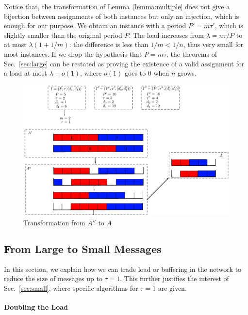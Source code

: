 \documentclass[a4paper,UKenglish,cleveref, autoref, thm-restate]{lipics-v2019}
\begin{document}
Notice that, the transformation of Lemma~\ref{lemma:multiple} does not give a bijection between assignments of both instances but only an injection, which is enough for our purpose. 
We obtain an instance with a period $P'= m\tau'$, which is slightly smaller than the original period $P$. The load increases from $\lambda = n \tau / P$ to at most $\lambda (1 + 1/m)$: the difference is less than $1/m < 1/n$, thus very small for most instances. If we drop the hypothesis that $P=m\tau$, the theorems of Sec.~\ref{sec:large} can be restated as proving the existence of a valid assignment for a load at most $\lambda - o(1)$, where $o(1)$ goes to $0$ when $n$ grows. 

\begin{figure}
 \begin{center}
\includegraphics[scale=0.75]{multipleperiod}
\end{center}
\caption{Transformation from $A''$ to $A$}
\label{fig:multipleperiod}
\end{figure}

\subsection{From Large to Small Messages}\label{sec:reduction}


In this section, we explain how we can trade load or buffering in the network to reduce the size of messages up to $\tau = 1$. This further justifies the interest of Sec.~\ref{sec:small}, where specific algorithms for $\tau = 1$ are given.

\paragraph*{Doubling the Load}
\end{document}

